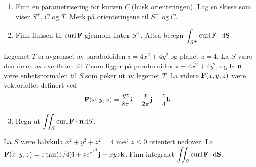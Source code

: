 \begin{enumerate}
  \item Finn en parametrisering for kurven $C$ (husk orienteringen). Lag en
    skisse som viser $S^+$, $C$ og $T$. Merk på orienteringene til $S^+$ og $C$.
  \item Finn fluksen til $\operatorname{curl} \mathbf{F}$ gjennom flaten $S^+$. Altså beregn
    $ \displaystyle 
    \int_{S^+} \operatorname{curl} \mathbf{F} \cdot \mathop{}\! \mathrm{d} \mathbf{S}\mathop{}\!.
    $
\end{enumerate}

\oppgave[K2012, Oppgave 6] Legemet $T$ er avgrenset av paraboloiden $z = 4x^2 +
4y^2$ og planet $z = 4$. La $S$ være den delen av overflaten til $T$ som ligger
på paraboloiden $z = 4x^2 + 4y^2$, og la $\mathbf{n}$ være enhetsnormalen til $S$
som peker ut av legemet $T$. La videre $\mathbf{F}(x,y,z)$ være vektorfeltet definert ved
%
\begin{equation*}
  \mathbf{F}(x,y,z)
  = \frac{yz}{8\pi} \mathbf{i} - \frac{x}{2\pi}\mathbf{j} + \frac{z}{4}\mathbf{k}.
\end{equation*}
%
\begin{enumerate}
    \setcounter{enumi}{2}
  \item Regn ut $\displaystyle \iint_S \operatorname{curl} \mathbf{F} \cdot \mathbf{n} \mathop{}\! \mathrm{d} S\mathop{}\!$.
\end{enumerate}

\oppgave[V2012, Oppgave 5] La $S$ være halvkula $x^2 + y^2 + z^2 = 4$ med $z\leq
0$ orientert nedover. La $\mathbf{F}(x,y,z) = x \tan (z/4) \mathbf{i} + x e^{e^{z^4}}\mathbf{j} +
xyz \mathbf{k}$. Finn integralet $\displaystyle \iint_S \operatorname{curl} \mathbf{F} \cdot \mathop{}\! \mathrm{d} \mathbf{S}\mathop{}\!$.



